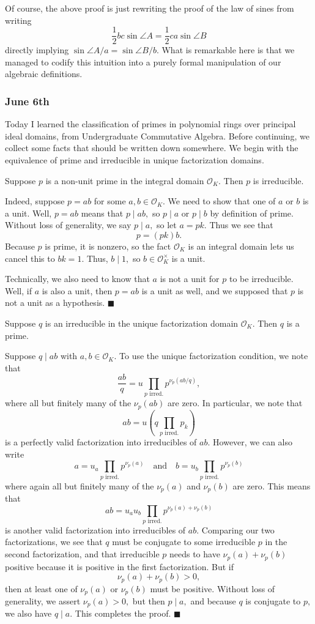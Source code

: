Of course, the above proof is just rewriting the proof of the law of sines from writing
\[\frac12bc\sin\angle A=\frac12ca\sin\angle B\]
directly implying $\sin\angle A/a=\sin\angle B/b.$ What is remarkable here is that we managed to codify this intuition into a purely formal manipulation of our algebraic definitions.

\subsubsection{June 6th}
Today I learned the classification of primes in polynomial rings over principal ideal domains, from Undergraduate Commutative Algebra. Before continuing, we collect some facts that should be written down somewhere. We begin with the equivalence of prime and irreducible in unique factorization domains.
\begin{lemma}
    Suppose $p$ is a non-unit prime in the integral domain $\mathcal O_K.$ Then $p$ is irreducible.
\end{lemma}
Indeed, suppose $p=ab$ for some $a,b\in\mathcal O_K.$ We need to show that one of $a$ or $b$ is a unit. Well, $p=ab$ means that $p\mid ab,$ so $p\mid a$ or $p\mid b$ by definition of prime. Without loss of generality, we say $p\mid a,$ so let $a=pk.$ Thus we see that
\[p=(pk)b.\]
Because $p$ is prime, it is nonzero, so the fact $\mathcal O_K$ is an integral domain lets us cancel this to $bk=1.$ Thus, $b\mid1,$ so $b\in\mathcal O_K^\times$ is a unit.

Technically, we also need to know that $a$ is not a unit for $p$ to be irreducible. Well, if $a$ is also a unit, then $p=ab$ is a unit as well, and we supposed that $p$ is not a unit as a hypothesis. $\blacksquare$

\begin{lemma}
    Suppose $q$ is an irreducible in the unique factorization domain $\mathcal O_K.$ Then $q$ is a prime.
\end{lemma}
Suppose $q\mid ab$ with $a,b\in\mathcal O_K.$ To use the unique factorization condition, we note that
\[\frac{ab}q=u\prod_{p\text{ irred.}}p^{\nu_p(ab/q)},\]
where all but finitely many of the $\nu_p(ab)$ are zero. In particular, we note that
\[ab=u\left(q\prod_{p\text{ irred.}}p_k\right)\]
is a perfectly valid factorization into irreducibles of $ab.$ However, we can also write
\[a=u_a\prod_{p\text{ irred.}}p^{\nu_p(a)}\quad\text{and}\quad b=u_b\prod_{p\text{ irred.}}p^{\nu_p(b)}\]
where again all but finitely many of the $\nu_p(a)$ and $\nu_p(b)$ are zero. This means that
\[ab=u_au_b\prod_{p\text{ irred.}}p^{\nu_p(a)+\nu_p(b)}\]
is another valid factorization into irreducibles of $ab.$ Comparing our two factorizations, we see that $q$ must be conjugate to some irreducible $p$ in the second factorization, and that irreducible $p$ needs to have $\nu_p(a)+\nu_p(b)$ positive because it is positive in the first factorization. But if
\[\nu_p(a)+\nu_p(b)>0,\]
then at least one of $\nu_p(a)$ or $\nu_p(b)$ must be positive. Without loss of generality, we assert $\nu_p(a)>0,$ but then $p\mid a,$ and because $q$ is conjugate to $p,$ we also have $q\mid a.$ This completes the proof. $\blacksquare$

